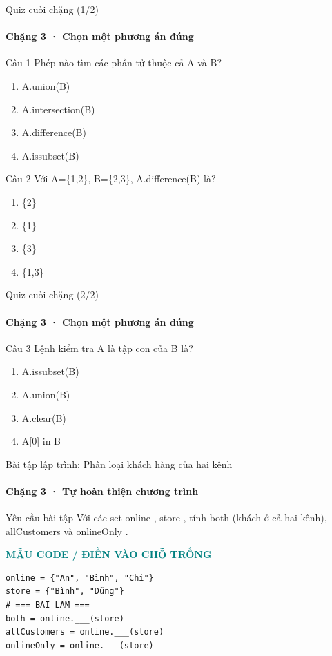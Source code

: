 \documentclass[aspectratio=169,10pt]{beamer}
\begin{document}
\begin{frame}[t]{Quiz cuối chặng (1/2)}
\framesubtitle{Chặng 3 · Chọn một phương án đúng}
\small
\begin{block}{Câu 1}
Phép nào tìm các phần tử thuộc cả A và B?\par\smallskip
\begin{enumerate}
\item A.union(B)
\item A.intersection(B)
\item A.difference(B)
\item A.issubset(B)
\end{enumerate}
\end{block}
\begin{block}{Câu 2}
Với A=\{1,2\}, B=\{2,3\}, A.difference(B) là?\par\smallskip
\begin{enumerate}
\item \{2\}
\item \{1\}
\item \{3\}
\item \{1,3\}
\end{enumerate}
\end{block}

\end{frame}

\begin{frame}[t]{Quiz cuối chặng (2/2)}
\framesubtitle{Chặng 3 · Chọn một phương án đúng}
\small
\begin{block}{Câu 3}
Lệnh kiểm tra A là tập con của B là?\par\smallskip
\begin{enumerate}
\item A.issubset(B)
\item A.union(B)
\item A.clear(B)
\item A[0] in B
\end{enumerate}
\end{block}

\end{frame}

\begin{frame}[fragile,t]{Bài tập lập trình: Phân loại khách hàng của hai kênh}
\framesubtitle{Chặng 3 · Tự hoàn thiện chương trình}
\begin{block}{Yêu cầu bài tập}
Với các set online , store , tính both (khách ở cả hai kênh), allCustomers và onlineOnly .
\end{block}
\textcolor{teal}{\scriptsize\textbf{MẪU CODE / ĐIỀN VÀO CHỖ TRỐNG}}\par
\begin{Verbatim}[fontsize=\scriptsize,frame=single,framesep=3mm,rulecolor=\color{teal!35},breaklines=true]
online = {"An", "Bình", "Chi"}
store = {"Bình", "Dũng"}
# === BAI LAM ===
both = online.___(store)
allCustomers = online.___(store)
onlineOnly = online.___(store)
\end{Verbatim}
\end{frame}
\end{document}
